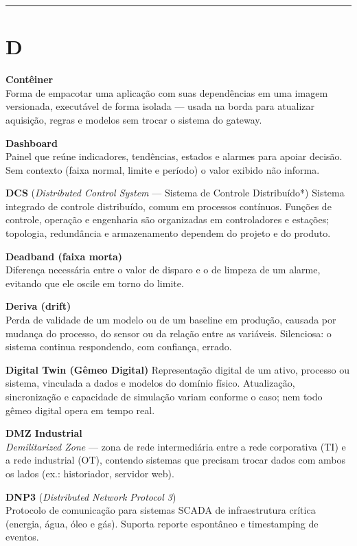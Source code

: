 \begin{center}\rule{0.5\linewidth}{0.5pt}\end{center}

\section{D}\label{d}

\textbf{Contêiner}\\
Forma de empacotar uma aplicação com suas dependências em uma imagem versionada, executável de forma isolada --- usada na borda para atualizar aquisição, regras e modelos sem trocar o sistema do gateway.

\textbf{Dashboard}\\
Painel que reúne indicadores, tendências, estados e alarmes para apoiar decisão. Sem contexto (faixa normal, limite e período) o valor exibido não informa.

\textbf{DCS} (\emph{Distributed Control System} --- Sistema de Controle Distribuído*)
Sistema integrado de controle distribuído, comum em processos contínuos. Funções de controle, operação e engenharia são organizadas em controladores e estações; topologia, redundância e armazenamento dependem do projeto e do produto.

\textbf{Deadband (faixa morta)}\\
Diferença necessária entre o valor de disparo e o de limpeza de um alarme, evitando que ele oscile em torno do limite.

\textbf{Deriva (drift)}\\
Perda de validade de um modelo ou de um baseline em produção, causada por mudança do processo, do sensor ou da relação entre as variáveis. Silenciosa: o sistema continua respondendo, com confiança, errado.

\textbf{Digital Twin (Gêmeo Digital)}
Representação digital de um ativo, processo ou sistema, vinculada a dados e modelos do domínio físico. Atualização, sincronização e capacidade de simulação variam conforme o caso; nem todo gêmeo digital opera em tempo real.

\textbf{DMZ Industrial}\\
\emph{Demilitarized Zone} --- zona de rede intermediária entre a rede corporativa (TI) e a rede industrial (OT), contendo sistemas que precisam trocar dados com ambos os lados (ex.: historiador, servidor web).

\textbf{DNP3} (\emph{Distributed Network Protocol 3})\\
Protocolo de comunicação para sistemas SCADA de infraestrutura crítica (energia, água, óleo e gás). Suporta reporte espontâneo e timestamping de eventos.

